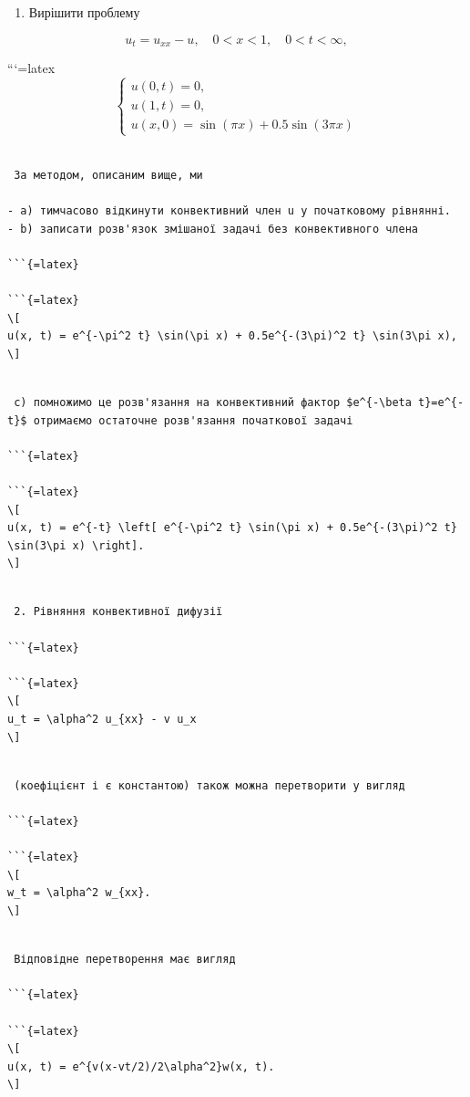 \documentclass[
  ukrainian,
]{article}
\providecommand{\tightlist}{%
  \setlength{\itemsep}{0pt}\setlength{\parskip}{0pt}}
\begin{document}
\begin{enumerate}
\def\labelenumi{\arabic{enumi}.}
\tightlist
\item
  Вирішити проблему
\end{enumerate}

\[
u_t = u_{xx} - u, \quad 0 < x < 1, \quad 0 < t < \infty,
\]

```{=latex}
\[
\begin{cases} u(0, t) = 0, \\ u(1, t) = 0, \\ u(x, 0) = \sin(\pi x) + 0.5\sin(3\pi x) \end{cases}
\]

\begin{verbatim}

 За методом, описаним вище, ми

- a) тимчасово відкинути конвективний член u у початковому рівнянні.
- b) записати розв'язок змішаної задачі без конвективного члена

```{=latex}

```{=latex}
\[
u(x, t) = e^{-\pi^2 t} \sin(\pi x) + 0.5e^{-(3\pi)^2 t} \sin(3\pi x),
\]
\end{verbatim}

\begin{verbatim}

 c) помножимо це розв'язання на конвективний фактор $e^{-\beta t}=e^{-t}$ отримаємо остаточне розв'язання початкової задачі

```{=latex}

```{=latex}
\[
u(x, t) = e^{-t} \left[ e^{-\pi^2 t} \sin(\pi x) + 0.5e^{-(3\pi)^2 t} \sin(3\pi x) \right].
\]
\end{verbatim}

\begin{verbatim}

 2. Рівняння конвективної дифузії

```{=latex}

```{=latex}
\[
u_t = \alpha^2 u_{xx} - v u_x
\]
\end{verbatim}

\begin{verbatim}

 (коефіцієнт і є константою) також можна перетворити у вигляд

```{=latex}

```{=latex}
\[
w_t = \alpha^2 w_{xx}.
\]
\end{verbatim}

\begin{verbatim}

 Відповідне перетворення має вигляд

```{=latex}

```{=latex}
\[
u(x, t) = e^{v(x-vt/2)/2\alpha^2}w(x, t).
\]
\end{verbatim}
\end{document}
